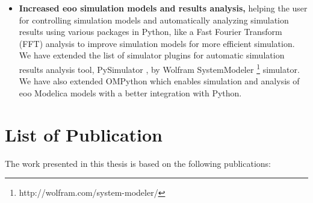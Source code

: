 \begin{itemize}
\item \textbf{Increased \acrshort{eoo} simulation models and results analysis,} helping the user for controlling simulation models and automatically analyzing simulation results using various packages in Python, like a Fast Fourier Transform (FFT) analysis to improve simulation models for more efficient simulation. We have extended the list of simulator plugins for automatic simulation results analysis tool, PySimulator \cite{pysimulator}, by Wolfram SystemModeler \footnote{http://wolfram.com/system-modeler/} simulator. We have also extended OMPython \cite{ompython} which enables simulation and analysis of \acrshort{eoo} Modelica models with a better integration with Python.

\end{itemize}


\section{List of Publication}
\label{sec:List of Publication}


The work presented in this thesis is based on the following publications:


